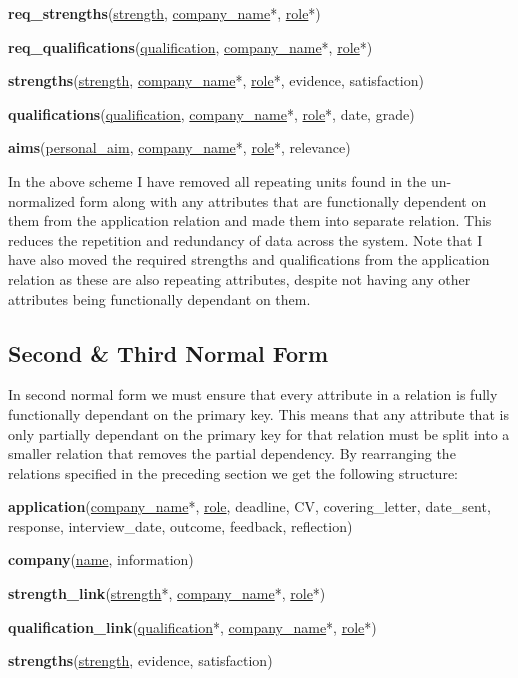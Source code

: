 \documentclass{article}
\begin{document}
\textbf{req\_strengths}(\underline{strength}, \underline{company\_name}*, \underline{role}*)

\textbf{req\_qualifications}(\underline{qualification}, \underline{company\_name}*, \underline{role}*)

\textbf{strengths}(\underline{strength}, \underline{company\_name}*, \underline{role}*, evidence, satisfaction)

\textbf{qualifications}(\underline{qualification}, \underline{company\_name}*, \underline{role}*, date, grade)

\textbf{aims}(\underline{personal\_aim}, \underline{company\_name}*, \underline{role}*, relevance)

In the above scheme I have removed all repeating units found in the un-normalized form along with any attributes that are functionally dependent on them from the application relation and made them into separate relation. This reduces the repetition and redundancy of data across the system. Note that I have also moved the required strengths and qualifications from the application relation as these are also repeating attributes, despite not having any other attributes being functionally dependant on them.

\subsection{Second \& Third Normal Form}

In second normal form we must ensure that every attribute in a relation is fully functionally dependant on the primary key. This means that any attribute that is only partially dependant on the primary key for that relation must be split into a smaller relation that removes the partial dependency. By rearranging the relations specified in the preceding section we get the following structure:

\textbf{application}(\underline{company\_name}*, \underline{role}, deadline, CV, covering\_letter, date\_sent, response, interview\_date, outcome, feedback, reflection)

\textbf{company}(\underline{name}, information)

\textbf{strength\_link}(\underline{strength}*, \underline{company\_name}*, \underline{role}*)

\textbf{qualification\_link}(\underline{qualification}*, \underline{company\_name}*, \underline{role}*)

\textbf{strengths}(\underline{strength}, evidence, satisfaction)
\end{document}
